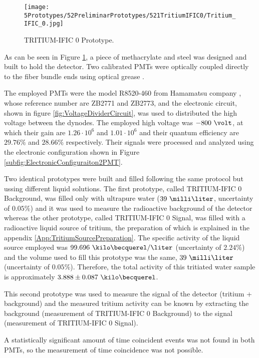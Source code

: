 \begin{figure}[h]
\centering
\texttt{[image: 5Prototypes/52PreliminarPrototypes/521TritiumIFIC0/Tritium\_IFIC\_0.jpg]}
\caption{TRITIUM-IFIC 0 Prototype.\label{fig:TritiumIFIC0}}
\end{figure}

As can be seen in Figure \ref{fig:TritiumIFIC0}, a piece of methacrylate and steel was designed and built to hold the detector. Two calibrated PMTs were optically coupled directly to the fiber bundle ends using optical grease \cite{OpticalGrease}.

The employed PMTs were the model R8520-460 from Hamamatsu company \cite{DataSheetPMTs}, whose reference number are ZB2771 and ZB2773, and the electronic circuit, shown in figure \ref{fig:VoltageDividerCircuit}, was used to distributed the high voltage between the dynodes. The employed high voltage was $-800~\volt$, at which their gain are $1.26 \cdot{} 10^6$ and $1.01 \cdot{} 10^6$ and their quantum efficiency are $29.76\%$ and $28.66\%$ respectively. Their signals were processed and analyzed using the electronic configuration shown in Figure \ref{subfig:ElectronicConfiguraiton2PMT}.

Two identical prototypes were built and filled following the same protocol but ussing different liquid solutions. The first prototype, called TRITIUM-IFIC 0 Background, was filled only with  ultrapure water ($39~\milli\liter$, uncertainty of $0.05\%$) and it was used to measure the radioactive background of the detector whereas the other prototype, called TRITIUM-IFIC 0 Signal, was filled with a radioactive liquid source of tritium, the preparation of which is explained in the appendix \ref{App:TritiumSourcePreparation}. The specific activity of the liquid source employed was $99.696~\kilo\becquerel/\liter$ (uncertainty of $2.24\%$) and the volume used to fill this prototype was the same, $39~\milli\liter$ (uncertainty of $0.05\%$). Therefore, the total activity of this tritiated water sample is approximately $3.888 \pm 0.087~\kilo\becquerel$. 

This second prototype was used to measure the signal of the detector (tritium + background) and the measured tritium activity can be known by extracting the background (measurement of TRITIUM-IFIC 0 Background) to the signal (measurement of TRITIUM-IFIC 0 Signal).

A statistically significant amount of time coincident events was not found in both PMTs, so the measurement of time coincidence was not possible. 

